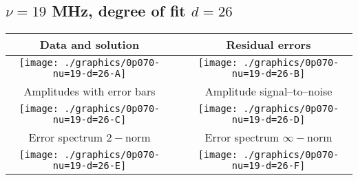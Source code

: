 

% 

\clearpage{}
\break{}

\subsection{$\nu = 19$ MHz, degree of fit $d = 26$}

\begin{table}[h]
    \begin{center}
        \begin{tabular}{ccc}
            Data and solution & \quad & Residual errors \\\hline
            \texttt{[image: ./graphics/0p070-nu=19-d=26-A]} &&
            \texttt{[image: ./graphics/0p070-nu=19-d=26-B]} \\[15pt]
            Amplitudes with error bars && Amplitude signal--to--noise \\\hline
            \texttt{[image: ./graphics/0p070-nu=19-d=26-C]} &&
            \texttt{[image: ./graphics/0p070-nu=19-d=26-D]} \\[15pt]
            Error spectrum $2-$norm && Error spectrum $\infty-$norm \\\hline
            \texttt{[image: ./graphics/0p070-nu=19-d=26-E]} &&
            \texttt{[image: ./graphics/0p070-nu=19-d=26-F]} \\[15pt]
        \end{tabular}
    \end{center}
\label{fig:elev=70, nu=19}
\end{table}



\endinput
